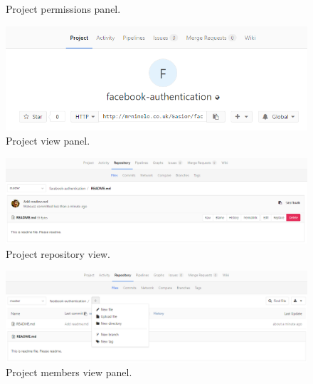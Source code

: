 \begin{appendix}
\begin{figure}[!htbp]
			\caption{Project permissions panel.}
			\label{fig:project-members-permissions}
		\end{figure}
		\begin{figure}[!htbp]
			\centering
			\includegraphics[width=1\textwidth]{img/ug-project/project-view}
			\caption{Project view panel.}
			\label{fig:project-view-panel}
		\end{figure}
		\begin{figure}[!htbp]
			\centering
			\includegraphics[width=1\textwidth]{img/ug-project/project-view2}
			\caption{Project repository view.}
			\label{fig:project-repository}
		\end{figure}
		\begin{figure}[!htbp]
			\centering
			\includegraphics[width=1\textwidth]{img/ug-project/project-view-repository}
			\caption{Project members view panel.}
			\label{fig:project-members}
		\end{figure}

\end{appendix}
